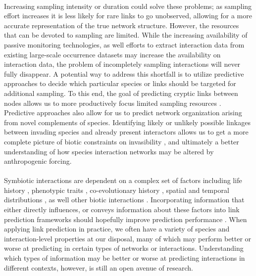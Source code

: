 \paragraph*{}
Increasing sampling intensity or duration could solve these problems; as sampling effort increases it is less likely for rare links to go unobserved, allowing for a more accurate representation of the true network structure. However, the resources that can be devoted to sampling are limited. While the increasing availability of passive monitoring technologies\cite{quintero2022methodological}, as well efforts to extract interaction data from existing large-scale occurrence datasets \cite{putman2021power} may increase the availability on interaction data, the problem of incompletely sampling interactions will never fully disappear. A potential way to address this shortfall is to utilize predictive approaches to decide which particular species or links should be targeted for additional sampling. To this end, the goal of predicting cryptic links between nodes allows us to more productively focus limited sampling resources \cite{terry2020finding}. Predictive approaches also allow for us to predict network organization arising from novel complements of species. Identifying likely or unlikely possible linkages between invading species and already present interactors allows us to get a more complete picture of biotic constraints on invasibility \cite{minoarivelo2016invading}, and ultimately a better understanding of how species interaction networks may be altered by anthropogenic forcing.  

\paragraph*{}
Symbiotic interactions are dependent on a complex set of factors including life history \cite{ramos2018fruit}, phenotypic traits \cite{rafferty2013}, co-evolutionary history \cite{eriksson2016evolution}, spatial and temporal distributions \cite{fricke2020accelerating, menke2012plant, laurindo2020drivers}, as well other biotic interactions \cite{carreira2020question}. Incorporating information that either directly influences, or conveys information about these factors into link prediction frameworks should hopefully improve prediction performance \cite{dallas2017predicting}. When applying link prediction in practice, we often have a variety of species and interaction-level properties at our disposal, many of which may perform better or worse at predicting in certain types of networks or interactions. Understanding which types of information may be better or worse at predicting interactions in different contexts, however, is still an open avenue of research. 

